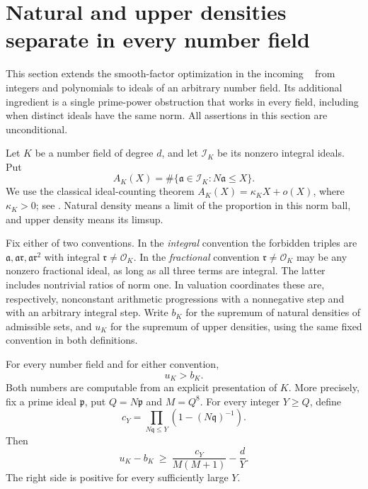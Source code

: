 \section{Natural and upper densities separate in every number field}
\label{sec:ideal-separation}

This section extends the smooth-factor optimization in the incoming
~\cite{prior-density-gaps} from integers
and polynomials to ideals of an arbitrary number field.  Its additional
ingredient is a single prime-power obstruction that works in every field,
including when distinct ideals have the same norm.  All assertions in this
section are unconditional.

Let $K$ be a number field of degree $d$, and let $\mathcal I_K$ be its
nonzero integral ideals.  Put
\[
 A_K(X)=\#\{\mathfrak a\in\mathcal I_K:N\mathfrak a\le X\}.
\]
We use the classical ideal-counting theorem
$A_K(X)=\kappa_K X+o(X)$, where $\kappa_K>0$; see
\cite{murty-vanorder}.  Natural density means a limit of the
proportion in this norm ball, and upper density means its limsup.

Fix either of two conventions.  In the \emph{integral} convention the
forbidden triples are
$\mathfrak a,\mathfrak a\mathfrak r,
\mathfrak a\mathfrak r^2$ with integral
$\mathfrak r\ne\mathcal O_K$.  In the \emph{fractional} convention
$\mathfrak r\ne\mathcal O_K$ may be any nonzero fractional ideal, as long
as all three terms are integral.  The latter includes nontrivial ratios
of norm one.  In valuation coordinates these are, respectively,
nonconstant arithmetic progressions with a nonnegative step and with an
arbitrary integral step.  Write $b_K$ for the supremum of natural
densities of admissible sets, and $u_K$ for the supremum of upper
densities, using the same fixed convention in both definitions.

\begin{theorem}
\label{thm:ideal-separation}
For every number field and for either convention,
\[
                         u_K>b_K.
\]
Both numbers are computable from an explicit presentation of $K$.
More precisely, fix a prime ideal $\mathfrak p$, put
$Q=N\mathfrak p$ and $M=Q^8$.  For every integer $Y\ge Q$, define
\[
 c_Y=\prod_{N\mathfrak q\le Y}(1-(N\mathfrak q)^{-1}).
\]
Then
\begin{equation}\label{eq:ideal-gap}
 u_K-b_K\ \ge\ \frac{c_Y}{M(M+1)}-\frac{d}{Y}.
\end{equation}
The right side is positive for every sufficiently large $Y$.
\end{theorem}

